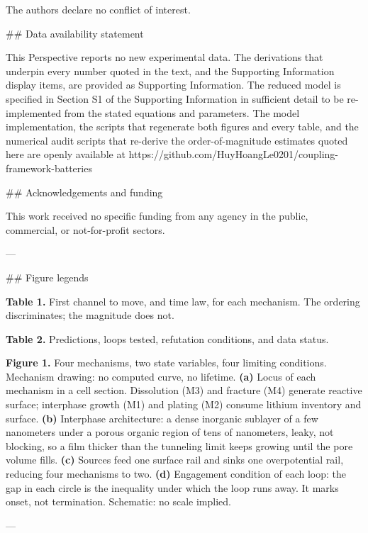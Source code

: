 The authors declare no conflict of interest.

## Data availability statement

This Perspective reports no new experimental data. The derivations that underpin every number quoted in the text, and the Supporting Information display items, are provided as Supporting Information. The reduced model is specified in Section S1 of the Supporting Information in sufficient detail to be re-implemented from the stated equations and parameters. The model implementation, the scripts that regenerate both figures and every table, and the numerical audit scripts that re-derive the order-of-magnitude estimates quoted here are openly available at https://github.com/HuyHoangLe0201/coupling-framework-batteries

## Acknowledgements and funding

This work received no specific funding from any agency in the public, commercial, or not-for-profit sectors.

---

## Figure legends

\textbf{Table 1.} First channel to move, and time law, for each mechanism. The ordering discriminates; the magnitude does not.

\textbf{Table 2.} Predictions, loops tested, refutation conditions, and data status.

\textbf{Figure 1.} Four mechanisms, two state variables, four limiting conditions. Mechanism drawing: no computed curve, no lifetime. \textbf{(a)} Locus of each mechanism in a cell section. Dissolution (M3) and fracture (M4) generate reactive surface; interphase growth (M1) and plating (M2) consume lithium inventory and surface. \textbf{(b)} Interphase architecture: a dense inorganic sublayer of a few nanometers under a porous organic region of tens of nanometers, leaky, not blocking, so a film thicker than the tunneling limit keeps growing until the pore volume fills. \textbf{(c)} Sources feed one surface rail and sinks one overpotential rail, reducing four mechanisms to two. \textbf{(d)} Engagement condition of each loop: the gap in each circle is the inequality under which the loop runs away. It marks onset, not termination. Schematic: no scale implied.

---
